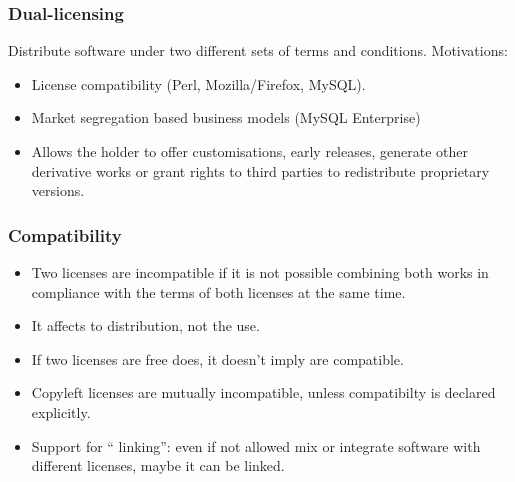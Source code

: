 \begin{frame}
\frametitle{Dual-licensing}

Distribute software under two different sets of terms and conditions. Motivations:

\begin{itemize}
\item License compatibility (Perl, Mozilla/Firefox, MySQL).
\item Market segregation based business models (MySQL Enterprise)
\item Allows the holder to offer customisations, early releases, generate other derivative works or grant rights to third parties to redistribute proprietary versions.
\end{itemize}

                                                 
\end{frame}



\begin{frame}
\frametitle{Compatibility}

\begin{itemize}
\item Two licenses are incompatible if it is not possible combining both works in compliance with the terms of  both licenses at the same time. 
\item It affects to distribution, not the use. 
\item If two licenses are free does, it doesn't imply are compatible. 
\item Copyleft licenses are mutually incompatible, unless compatibilty is declared explicitly. 
\item Support for `` linking'': even if not allowed mix or integrate software with different licenses, maybe it can be linked. 
\end{itemize}

\end{frame}


